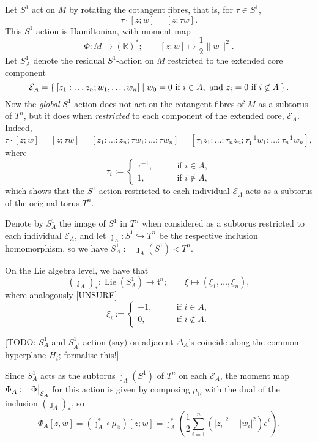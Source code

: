 \documentclass{article}
\newcommand{\lra}{\longrightarrow}
\newcommand{\RR}{\mathbb{R}}
\newcommand{\mcE}{\mathcal{E}}
\newcommand{\mft}{\mathfrak{t}}
\DeclareMathOperator{\Lie}{Lie}
\newcommand\restr[2]{{%
		\left.\kern-\nulldelimiterspace %
		#1 %
		\vphantom{\big|} %
		\right|_{#2} %
}}
\begin{document}
	Let $S^{1}$ act on $M$ by rotating the cotangent fibres, that is, for $\tau \in S^{1}$,
	\[
		\tau \cdot [z; w] = [z; \tau w].
	\]
	This $S^{1}$-action is Hamiltonian, with moment map
	\[
		\Phi : M \lra (\RR)^{\ast}; \qquad [z:w] \longmapsto \frac{1}{2} \|w\|^{2}.
	\]
	Let $S_{A}^{1}$ denote the residual $S^{1}$-action on $M$ restricted to the extended core component 
	\[
		\mcE_{A} = \Set{ [z_{1}: \ldots z_{n}; w_{1}, \ldots, w_{n}] | w_{0} = 0 \text{ if } i \in A, \text{ and } z_{i} = 0 \text{ if } i \not\in A }.
	\]
	Now the \emph{global }$S^{1}$-action does not act on the cotangent fibres of $M$ as a subtorus of $T^{n}$, but it does when \emph{restricted} to each component of the extended core, $\mcE_{A}$. Indeed,
	\[
		\tau \cdot [z; w] = [z; \tau w] = [z_{1} : \ldots : z_{n} ; \tau w_{1} : \ldots : \tau w_{n} ] = [\tau_{1 }z_{1} : \ldots : \tau_{n}z_{n} ; \tau_{1}^{-1}w_{1} : \ldots : \tau_{n}^{-1} w_{n} ],
	\]
	where
	\[
		\tau_{i} :=
		\begin{cases}
			\tau^{-1}, \qquad &\text{if } i \in A, \\
			1, \qquad &\text{if } i \not\in A,
		\end{cases}
	\]
	which shows that the $S^{1}$-action restricted to each individual $\mcE_{A}$ acts as a subtorus of the original torus $T^{n}$.
	
	Denote by $S_{A}^{1}$ the image of $S^{1}$ in $T^{n}$ when considered as a subtorus restricted to each individual $\mcE_{A}$, and let $\jmath_{A} : S^{1} \hookrightarrow T^{n}$ be the respective inclusion homomorphism, so we have $S_{A}^{1} := \jmath_{A}(S^{1}) \lhd T^{n}$.
	
	On the Lie algebra level, we have that
	\[
		(\jmath_{A})_{\ast} : \Lie(S_{A}^{1})  \lra \mft^{n}; \qquad \xi \longmapsto ( \xi_{1}, \ldots, \xi_{n}),
	\]
	where analogously [UNSURE]
	\[
		\xi_{i} :=
		\begin{cases}
			-1, \qquad &\text{if } i \in A, \\
			0, \qquad &\text{if } i \not\in A.
		\end{cases}
	\]
	
	[TODO: $S^{1}_{A}$ and $S_{A^{\prime}}^{1}$-action (say) on adjacent $\Delta_{A}$'s coincide along the common hyperplane $H_{i}$; formalise this!]
	
	Since $S_{A}^{1}$ acts as the subtorus $\jmath_{A}(S^{1})$ of $T^{n}$ on each $\mcE_{A}$, the moment map $\Phi_{A} := \restr{\Phi}{\mcE_{A}}$ for this action is given by composing $\mu_{\RR}$ with the dual of the inclusion $(\jmath_{A})_{\ast}$, so
	\[
		\Phi_{A}[z,w] = \left( \jmath_{A}^{\ast} \circ \mu_{\RR} \right)[z;w] = \jmath_{A}^{\ast} \left( \frac{1}{2} \sum_{i = 1}^{n} \left( |z_{i}|^{2} - |w_{i}|^{2} \right) e^{i} \right).
	\]
	
	
	  
	
	
\end{document}
